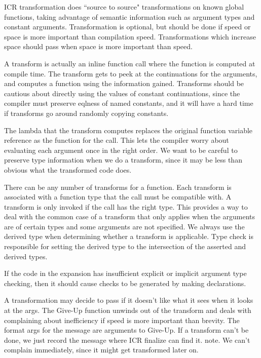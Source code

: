 ICR transformation does ``source to source" transformations on known global
functions, taking advantage of semantic information such as argument types and
constant arguments.  Transformation is optional, but should be done if speed or
space is more important than compilation speed.  Transformations which increase
space should pass when space is more important than speed.

A transform is actually an inline function call where the function is computed
at compile time.  The transform gets to peek at the continuations for the
arguments, and computes a function using the information gained.  Transforms
should be cautious about directly using the values of constant continuations,
since the compiler must preserve eqlness of named constants, and it will have a
hard time if transforms go around randomly copying constants.

The lambda that the transform computes replaces the original function variable
reference as the function for the call.  This lets the compiler worry about
evaluating each argument once in the right order.  We want to be careful to
preserve type information when we do a transform, since it may be less than
obvious what the transformed code does.

There can be any number of transforms for a function.  Each transform is
associated with a function type that the call must be compatible with.  A
transform is only invoked if the call has the right type.  This provides a way
to deal with the common case of a transform that only applies when the
arguments are of certain types and some arguments are not specified.  We always
use the derived type when determining whether a transform is applicable.  Type
check is responsible for setting the derived type to the intersection of the
asserted and derived types.

If the code in the expansion has insufficient explicit or implicit argument
type checking, then it should cause checks to be generated by making
declarations.

A transformation may decide to pass if it doesn't like what it sees when it
looks at the args.  The Give-Up function unwinds out of the transform and deals
with complaining about inefficiency if speed is more important than brevity.
The format args for the message are arguments to Give-Up.  If a transform can't
be done, we just record the message where ICR finalize can find it.  note.  We
can't complain immediately, since it might get transformed later on.


